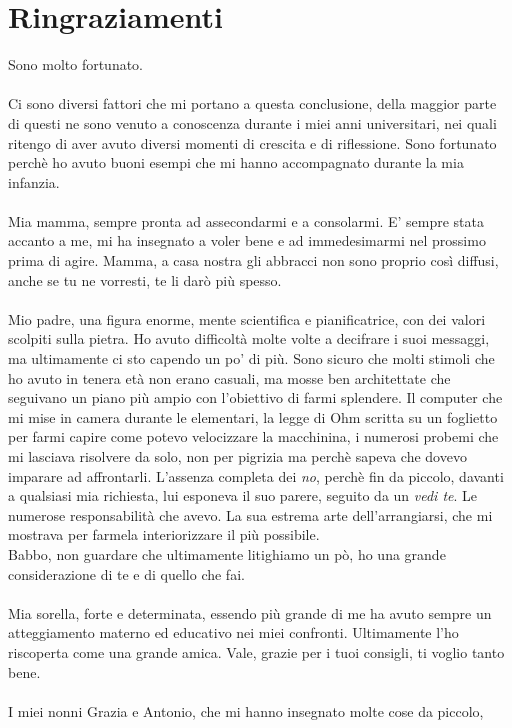 \chapter{Ringraziamenti}\label{ch:ringraziamenti}
Sono molto fortunato.\\\\
 Ci sono diversi fattori che mi portano a questa conclusione, della maggior parte di questi
ne sono venuto a conoscenza durante i miei anni universitari, nei quali ritengo di aver avuto diversi momenti di crescita
e di riflessione.
Sono fortunato perchè ho avuto buoni esempi che mi hanno accompagnato durante la mia infanzia.
\\\\Mia mamma, sempre pronta ad assecondarmi e a consolarmi. E' sempre stata accanto a me, mi ha insegnato a voler bene e ad immedesimarmi nel prossimo prima di agire.
Mamma, a casa nostra gli abbracci non sono proprio così diffusi, anche se tu ne vorresti, te li darò più spesso.
\\\\Mio padre, una figura enorme, mente scientifica e pianificatrice, con dei valori scolpiti sulla pietra. Ho avuto difficoltà molte volte a decifrare i suoi messaggi,
ma ultimamente ci sto capendo un po' di più. Sono sicuro che molti stimoli che ho avuto in tenera età non erano casuali, ma mosse ben architettate
che seguivano un piano più ampio con l'obiettivo di farmi splendere. Il computer che mi mise in camera durante le elementari, la legge di Ohm scritta su un foglietto per farmi capire 
come potevo velocizzare la macchinina, i numerosi probemi che mi lasciava risolvere da solo, non per pigrizia ma perchè sapeva che dovevo imparare ad affrontarli.
 L'assenza completa dei \emph{no}, perchè fin da piccolo, davanti a qualsiasi mia richiesta, lui esponeva il suo parere, seguito da un \emph{vedi te}.
Le numerose responsabilità che avevo. La sua estrema arte dell'arrangiarsi, che mi mostrava per farmela interiorizzare il più possibile.
\\Babbo, non guardare che ultimamente litighiamo un pò, ho una grande considerazione di te e di quello che fai.
\\\\Mia sorella, forte e determinata, essendo più grande di me ha avuto sempre un atteggiamento materno ed educativo nei miei confronti. 
Ultimamente l'ho riscoperta come una grande amica.
Vale, grazie per i tuoi consigli, ti voglio tanto bene.
\\\\
I miei nonni Grazia e Antonio, che mi hanno insegnato molte cose da piccolo,
